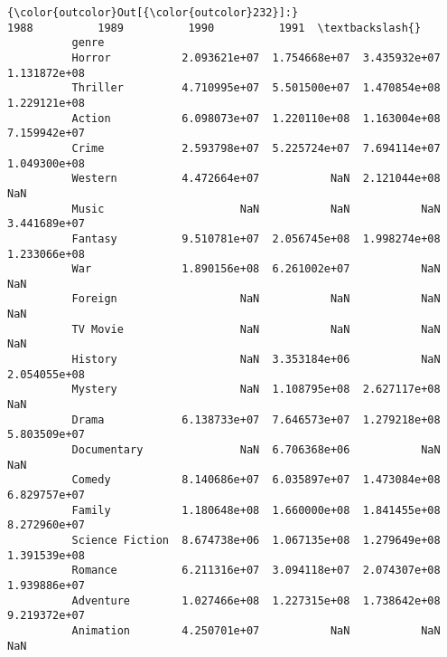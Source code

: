 \documentclass[11pt]{article}
\begin{document}
\begin{Verbatim}[commandchars=\\\{\}]
{\color{outcolor}Out[{\color{outcolor}232}]:}                          1988          1989          1990          1991  \textbackslash{}
          genre                                                                     
          Horror           2.093621e+07  1.754668e+07  3.435932e+07  1.131872e+08   
          Thriller         4.710995e+07  5.501500e+07  1.470854e+08  1.229121e+08   
          Action           6.098073e+07  1.220110e+08  1.163004e+08  7.159942e+07   
          Crime            2.593798e+07  5.225724e+07  7.694114e+07  1.049300e+08   
          Western          4.472664e+07           NaN  2.121044e+08           NaN   
          Music                     NaN           NaN           NaN  3.441689e+07   
          Fantasy          9.510781e+07  2.056745e+08  1.998274e+08  1.233066e+08   
          War              1.890156e+08  6.261002e+07           NaN           NaN   
          Foreign                   NaN           NaN           NaN           NaN   
          TV Movie                  NaN           NaN           NaN           NaN   
          History                   NaN  3.353184e+06           NaN  2.054055e+08   
          Mystery                   NaN  1.108795e+08  2.627117e+08           NaN   
          Drama            6.138733e+07  7.646573e+07  1.279218e+08  5.803509e+07   
          Documentary               NaN  6.706368e+06           NaN           NaN   
          Comedy           8.140686e+07  6.035897e+07  1.473084e+08  6.829757e+07   
          Family           1.180648e+08  1.660000e+08  1.841455e+08  8.272960e+07   
          Science Fiction  8.674738e+06  1.067135e+08  1.279649e+08  1.391539e+08   
          Romance          6.211316e+07  3.094118e+07  2.074307e+08  1.939886e+07   
          Adventure        1.027466e+08  1.227315e+08  1.738642e+08  9.219372e+07   
          Animation        4.250701e+07           NaN           NaN           NaN   
          

\end{Verbatim}
\end{document}
